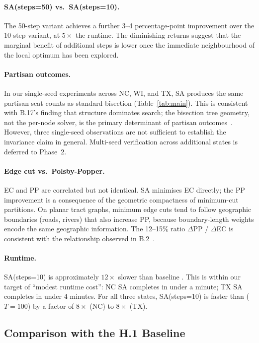\paragraph{SA(steps=50) vs.\ SA(steps=10).}
The 50-step variant achieves a further 3--4 percentage-point improvement
over the 10-step variant, at $5\times$ the runtime.
The diminishing returns suggest that the marginal benefit of additional
steps is lower once the immediate neighbourhood of the \metis{} local
optimum has been explored.

\paragraph{Partisan outcomes.}
In our single-seed experiments across NC, WI, and TX, SA produces the same
partisan seat counts as standard \metis{} bisection (Table~\ref{tab:main}).
This is consistent with B.17's finding that structure dominates search; the
bisection tree geometry, not the per-node solver, is the primary determinant
of partisan outcomes~\citep{b8paper}.
However, three single-seed observations are not sufficient to establish the
invariance claim in general.
Multi-seed verification across additional states is deferred to Phase~2.

\paragraph{Edge cut vs.\ Polsby-Popper.}
EC and PP are correlated but not identical.
SA minimises EC directly; the PP improvement is a consequence of the
geometric compactness of minimum-cut partitions.
On planar tract graphs, minimum edge cuts tend to follow geographic
boundaries (roads, rivers) that also increase PP, because boundary-length
weights encode the same geographic information.
The 12--15\% ratio $\Delta$PP / $\Delta$EC is consistent with the
relationship observed in B.2~\citep{b2paper}.

\paragraph{Runtime.}
SA(steps=10) is approximately $12\times$ slower than baseline \metis{}.
This is within our target of ``modest runtime cost'':
NC SA completes in under a minute; TX SA completes in under 4 minutes.
For all three states, SA(steps=10) is faster than \be{}($T=100$) by a
factor of $8\times$ (NC) to $8\times$ (TX).

\subsection{Comparison with the H.1 Baseline}


